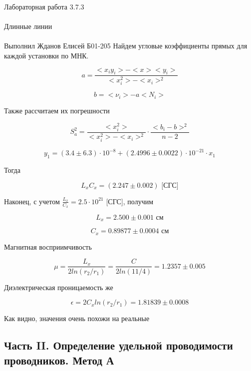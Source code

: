 \documentclass{astroedu-lab}
\begin{document}
\begin{problem}{\huge Лабораторная работа 3.7.3\\\\Длинные линии\\\\Выполнил Жданов Елисей Б01-205}
Найдем угловые коэффициенты прямых для каждой установки по МНК.

\[
	a = \frac{<x_i y_i> - < x > < y_i >}{< x_i^2> - < x_i >^2}
\]

\[
	b = < \nu_i > - a < N_i >
\]

Также рассчитаем их погрешности

\begin{equation}
	S_a^2 = \frac{< x_i^2>}{< x_i^2 > - < x_i >^2} \cdot \frac{<  b_i - b > ^2}{n - 2}
\end{equation}

\begin{equation}
	y_1 = (3.4 \pm 6.3) \cdot 10^{-8} + (2.4996 \pm 0.0022) \cdot 10^{-21} \cdot x_1
\end{equation}

Тогда

\begin{equation}
	L_x C_x = (2.247 \pm 0.002) \text{ [СГС]}
\end{equation}

Наконец, с учетом $\frac{L_x}{C_x} = 2.5 \cdot 10^{21}$ [СГС], получим

\begin{equation}
	L_x = 2.500 \pm 0.001 \text{ см}
\end{equation}

\begin{equation}
	C_x = 0.89877 \pm 0.0004 \text{ см}
\end{equation}

Магнитная восприимчивость

\begin{equation}
	\mu = \frac{L_x}{2 ln(r_2 / r_1)} = \frac{C}{2 ln(11 / 4)} = 1.2357 \pm 0.005
\end{equation}

Диэлектрическая проницаемость же

\begin{equation}
	\epsilon = 2 C_x ln(r_2/r_1)  = 1.81839 \pm 0.0008
\end{equation}

Как видно, значения очень похожи на реальные

\subsection{Часть II. Определение удельной проводимости проводников. Метод А}


\end{problem}
\end{document}
